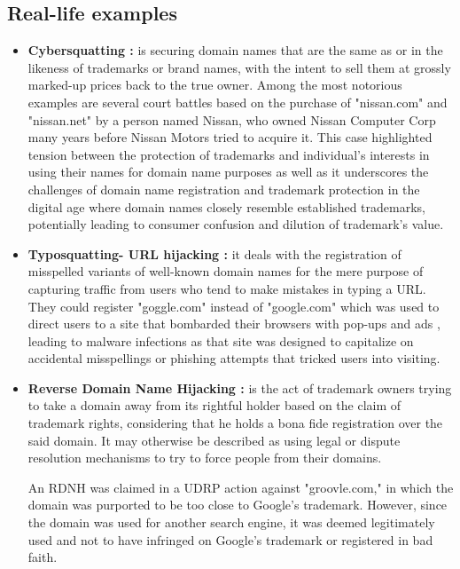 \subsection{Real-life examples}

\begin{itemize}
    \item \textbf{Cybersquatting :} is securing domain names that are the same as or in the likeness of trademarks or brand names, with the intent to sell them at grossly marked-up prices back to the true owner. Among the most notorious examples are several court battles based on the purchase of "nissan.com" and "nissan.net" by a person named Nissan, who owned Nissan Computer Corp many years before Nissan Motors tried to acquire it. This case highlighted tension between the protection of trademarks and individual's interests in using their names for domain name purposes as well as it underscores the challenges of domain name registration and trademark protection in the digital age where domain names closely resemble established trademarks, potentially leading to consumer confusion and dilution of trademark’s value. \cite{Rosznyai2005}
    
    \item \textbf{Typosquatting- URL hijacking :} it deals with the registration of misspelled variants of well-known domain names for the mere purpose of capturing traffic from users who tend to make mistakes in typing a URL. They could register "goggle.com" instead of "google.com" which was used to direct users to a site that bombarded their browsers with pop-ups and ads , leading to malware infections as that site was designed to capitalize on accidental misspellings or phishing  attempts that tricked users into visiting. \cite{SplunkTyposquatting}

     \item \textbf{Reverse Domain Name Hijacking  :} is the act of trademark owners trying to take a domain away from its rightful holder based on the claim of trademark rights, considering that he holds a bona fide registration over the said domain. It may otherwise be described as using legal or dispute resolution mechanisms to try to force people from their domains. \cite{Sun2006DomainTrademarkConflict}

    An RDNH was claimed in a UDRP action against "groovle.com," in which the domain was purported to be too close to Google's trademark. However, since the domain was used for another search engine, it was deemed legitimately used and not to have infringed on Google's trademark or registered in bad faith. \cite{Singh2011ReverseDomainHijacking}


\end{itemize}
